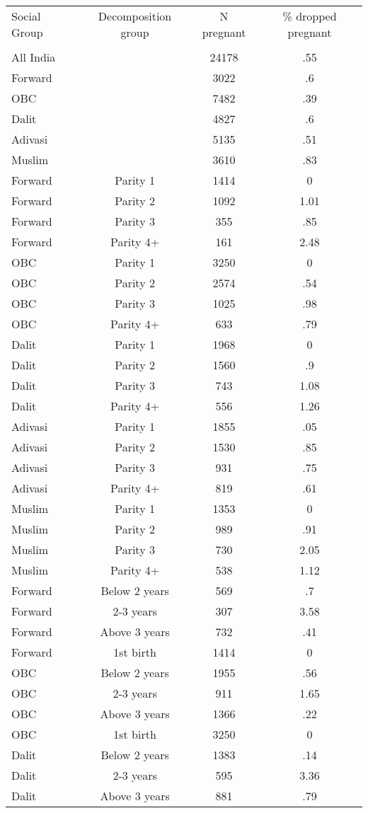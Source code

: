 \begin{tabular}{lccc}
\toprule
Social Group & Decomposition group & N pregnant & \% dropped pregnant \\\\
\midrule
All India&&24178&.55\\
Forward&&3022&.6\\
OBC&&7482&.39\\
Dalit&&4827&.6\\
Adivasi&&5135&.51\\
Muslim&&3610&.83\\
Forward&Parity 1&1414&0\\
Forward&Parity 2&1092&1.01\\
Forward&Parity 3&355&.85\\
Forward&Parity 4+&161&2.48\\
OBC&Parity 1&3250&0\\
OBC&Parity 2&2574&.54\\
OBC&Parity 3&1025&.98\\
OBC&Parity 4+&633&.79\\
Dalit&Parity 1&1968&0\\
Dalit&Parity 2&1560&.9\\
Dalit&Parity 3&743&1.08\\
Dalit&Parity 4+&556&1.26\\
Adivasi&Parity 1&1855&.05\\
Adivasi&Parity 2&1530&.85\\
Adivasi&Parity 3&931&.75\\
Adivasi&Parity 4+&819&.61\\
Muslim&Parity 1&1353&0\\
Muslim&Parity 2&989&.91\\
Muslim&Parity 3&730&2.05\\
Muslim&Parity 4+&538&1.12\\
Forward&Below 2 years&569&.7\\
Forward&2-3 years&307&3.58\\
Forward&Above 3 years&732&.41\\
Forward&1st birth&1414&0\\
OBC&Below 2 years&1955&.56\\
OBC&2-3 years&911&1.65\\
OBC&Above 3 years&1366&.22\\
OBC&1st birth&3250&0\\
Dalit&Below 2 years&1383&.14\\
Dalit&2-3 years&595&3.36\\
Dalit&Above 3 years&881&.79\\

\end{tabular}

